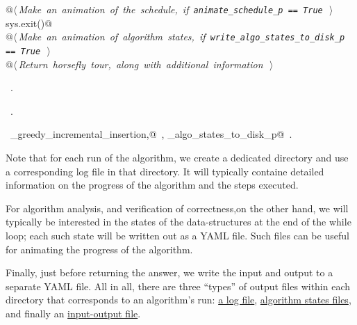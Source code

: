 \documentclass[11.5pt]{report}
\begin{document}
\begin{flushleft}
\begin{list}{}{}
\mbox{}\verb@      @\hbox{$\langle\,${\itshape Make an animation of the schedule, if \verb|animate_schedule_p == True|}\nobreak\ {\footnotesize {}}$\,\rangle$}\verb@@\\
\mbox{}\verb@      sys.exit()@\\
\mbox{}\verb@      @\hbox{$\langle\,${\itshape Make an animation of algorithm states, if \verb|write_algo_states_to_disk_p == True|}\nobreak\ {\footnotesize {}}$\,\rangle$}\verb@@\\
\mbox{}\verb@      @\hbox{$\langle\,${\itshape Return horsefly tour, along with additional information}\nobreak\ {\footnotesize {}}$\,\rangle$}\verb@@\\
\mbox{}\verb@@{\NWsep}
\end{list}
\vspace{-1.5ex}
\footnotesize
\begin{list}{}{\setlength{\itemsep}{-\parsep}\setlength{\itemindent}{-\leftmargin}}
\item \NWtxtMacroDefBy\ .
\item \NWtxtMacroRefIn\ .
\item \NWtxtIdentsDefed\nobreak\  \verb@algo_greedy_incremental_insertion,@\nobreak\ , \verb@write_algo_states_to_disk_p@\nobreak\ .
\item{}
\end{list}
\vspace{4ex}
\end{flushleft}
\vspace{-0.8cm}\newchunk Note that for each run of the algorithm, we create a dedicated directory and 
use a corresponding log file  in that directory. It will typically containe detailed 
information on the progress of the algorithm and the steps executed. 

For algorithm analysis, and verification of correctness,on the other hand, we will 
typically  be interested in the states of the data-structures at the end of 
the while loop; each such state will be written out as a YAML file. Such files can 
be useful for animating the progress of the algorithm. 

Finally, just before returning the answer, we write the input and output 
to a separate YAML file. All in all, there are three ``types'' of output files
within each directory that corresponds to an algorithm's run: 
\underline{a log file}, \underline{algorithm states files}, and finally 
an \underline{input-output file}. 
\end{document}
